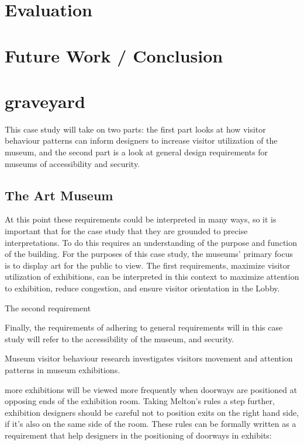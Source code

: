 \documentclass[12pt]{ucthesis}
\begin{document}
\chapter{Evaluation}


\chapter{Future Work / Conclusion}


\chapter{graveyard}
This case study will take on two parts: the first part looks at how visitor behaviour patterns can inform designers to increase visitor utilization of the museum, and the second part is a look at general design requirements for museums of accessibility and security.  

\section{The Art Museum}
At this point these requirements could be interpreted in many ways, so it is important that for the case study that they are grounded to precise interpretations. To do this requires an understanding of the purpose and function of the building. For the purposes of this case study, the museums' primary focus is to display art for the public to view. The first requirements, maximize visitor utilization of exhibitions, can be interpreted in this context to maximize attention to exhibition, reduce congestion, and ensure visitor orientation in the Lobby. 

The second requirement 

Finally, the requirements of adhering to general requirements will in this case study will refer to the accessibility of the museum, and security.  

Museum visitor behaviour research investigates visitors movement and attention patterns in museum exhibitions.

\begin{figure}[h]
   \centering
   \hspace{10 mm}
\end{figure}

more exhibitions will be viewed more frequently when doorways are positioned at opposing ends of the exhibition room. Taking Melton's rules a step further, exhibition designers should be careful not to position exits on the right hand side, if it's also on the same side of the room. These rules can be formally written as a requirement that help designers in the positioning of doorways in exhibits:
\end{document}

